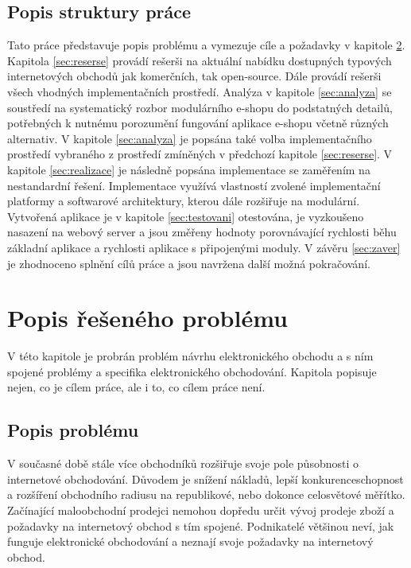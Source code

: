 \documentclass[11pt,twoside,a4paper]{book}
\begin{document}
\section{Popis struktury práce}
Tato práce představuje popis problému a vymezuje cíle a požadavky v kapitole \ref{sec:popisproblemu}. Kapitola \ref{sec:reserse} provádí rešerši na aktuální nabídku dostupných typových internetových obchodů jak komerčních, tak open-source. Dále provádí rešerši všech vhodných implementačních prostředí. Analýza v kapitole \ref{sec:analyza} se soustředí na systematický rozbor modulárního e-shopu do podstatných detailů, potřebných k nutnému porozumění fungování aplikace e-shopu včetně různých alternativ. V kapitole \ref{sec:analyza} je popsána také volba implementačního prostředí vybraného z prostředí zmíněných v předchozí kapitole \ref{sec:reserse}. V kapitole \ref{sec:realizace} je následně popsána implementace se zaměřením na nestandardní řešení. Implementace využívá vlastností zvolené implementační platformy a softwarové architektury, kterou dále rozšiřuje na modulární. Vytvořená aplikace je v kapitole \ref{sec:testovani} otestována, je vyzkoušeno nasazení na webový server a jsou změřeny hodnoty porovnávající rychlosti běhu základní aplikace a rychlosti aplikace s připojenými moduly. V závěru \ref{sec:zaver} je zhodnoceno splnění cílů práce a jsou navržena další možná pokračování. 


\chapter{Popis řešeného problému}
\label{sec:popisproblemu}

V této kapitole je probrán problém návrhu elektronického obchodu a s ním spojené problémy a specifika elektronického obchodování. Kapitola popisuje nejen, co je cílem práce, ale i to, co cílem práce není.

\section{Popis problému}

V současné době stále více obchodníků rozšiřuje svoje pole působnosti o internetové obchodování. Důvodem je snížení nákladů, lepší konkurenceschopnost a rozšíření obchodního radiusu na republikové, nebo dokonce celosvětové měřítko. Začínající maloobchodní prodejci nemohou dopředu určit vývoj prodeje zboží a požadavky na internetový obchod s tím spojené. Podnikatelé většinou neví, jak funguje elektronické obchodování a neznají svoje požadavky na internetový obchod. 
\end{document}
